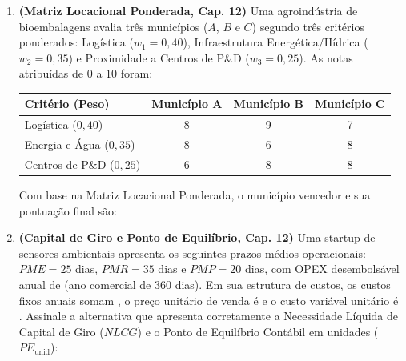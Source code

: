 \begin{enumerate}[leftmargin=1.6em, itemsep=8pt]

  \item \textbf{(Matriz Locacional Ponderada, Cap. 12)} Uma agroindústria de bioembalagens avalia três municípios ($A$, $B$ e $C$) segundo três critérios ponderados: Logística ($w_1 = 0{,}40$), Infraestrutura Energética/Hídrica ($w_2 = 0{,}35$) e Proximidade a Centros de P\&D ($w_3 = 0{,}25$). As notas atribuídas de $0$ a $10$ foram:
  \begin{center}
  \small
  \begin{tabular}{@{}lccc@{}}
    \toprule
    \textbf{Critério (Peso)} & \textbf{Município A} & \textbf{Município B} & \textbf{Município C} \\
    \midrule
    Logística ($0{,}40$) & 8 & 9 & 7 \\
    Energia e Água ($0{,}35$) & 8 & 6 & 8 \\
    Centros de P\&D ($0{,}25$) & 6 & 8 & 8 \\
    \bottomrule
  \end{tabular}
  \end{center}
  Com base na Matriz Locacional Ponderada, o município vencedor e sua pontuação final são:

  \item \textbf{(Capital de Giro e Ponto de Equilíbrio, Cap. 12)} Uma startup de sensores ambientais apresenta os seguintes prazos médios operacionais: $PME = 25$ dias, $PMR = 35$ dias e $PMP = 20$ dias, com OPEX desembolsável anual de  (ano comercial de $360$ dias). Em sua estrutura de custos, os custos fixos anuais somam , o preço unitário de venda é  e o custo variável unitário é . Assinale a alternativa que apresenta corretamente a Necessidade Líquida de Capital de Giro ($NLCG$) e o Ponto de Equilíbrio Contábil em unidades ($PE_{\text{unid}}$):


\end{enumerate}
